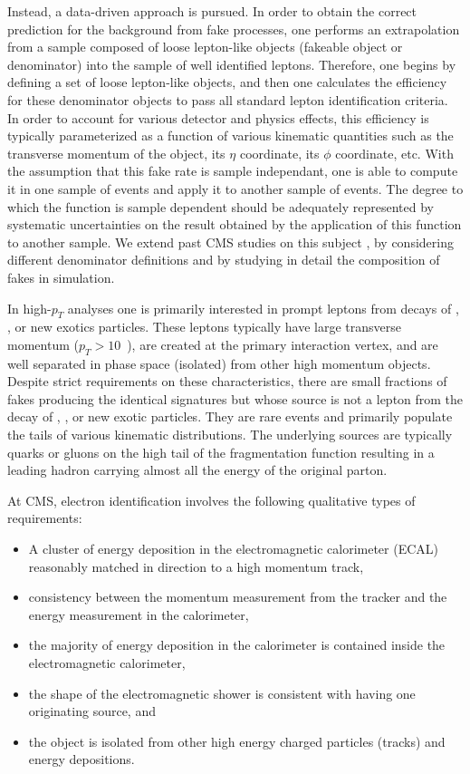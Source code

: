 \documentclass{cmspaper}
\begin{document}
Instead, a data-driven approach is pursued. In order to obtain the correct prediction for the background from fake processes, one performs an extrapolation from a sample composed of loose lepton-like objects (fakeable object or denominator) into the sample of well identified leptons. Therefore, one begins by defining a set of loose lepton-like objects, and then one calculates the efficiency for these denominator objects to pass all standard lepton identification criteria. In order to account for various detector and physics effects, this efficiency  is typically parameterized as a function of various kinematic quantities such as the transverse momentum of the object, its $\eta$ coordinate, its $\phi$ coordinate, etc. With the assumption that this fake rate is sample independant, one is able to compute it in one sample of events and apply it to another sample of events. The degree to which the function is sample dependent should be adequately represented by systematic uncertainties on the result obtained by the application of this function to another sample. We extend past CMS studies on this subject \cite{fakeLeptonNote}, by considering different denominator definitions and by studying in detail the composition of fakes in simulation.

In high-$p_T$ analyses one is primarily interested in prompt leptons from decays of \WPM, \Z, or new exotics particles. These leptons typically have large transverse momentum ($p_T > 10$~\GeVc), are created at the primary interaction vertex, and are well separated in phase space (isolated) from other high momentum objects. Despite strict requirements on these characteristics, there are small fractions of fakes producing the identical signatures but whose source is not a lepton from the decay of \WPM, \Z, or new exotic particles. They are rare events and primarily populate the tails of various kinematic distributions. The underlying sources are typically quarks or gluons on the high tail of the fragmentation function resulting in a leading hadron carrying almost all the energy of the original parton.


At CMS, electron identification involves the following qualitative types of requirements:
\begin{itemize}
\item A cluster of energy deposition in the electromagnetic calorimeter (ECAL) reasonably matched in direction to a high momentum track,
\item consistency between the momentum measurement from the tracker and the energy measurement in the calorimeter,
\item the majority of energy deposition in the calorimeter is contained inside the electromagnetic calorimeter,
\item the shape of the electromagnetic shower is consistent with having one originating source, and
\item the object is isolated from other high energy charged particles (tracks) and energy depositions.
\end{itemize}
\end{document}

